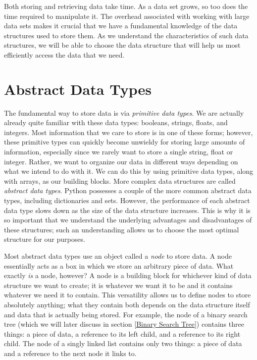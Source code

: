 \label{lab:Python_DataStructures}

Both storing and retrieving data take time. As a data set grows, so too does the time required to manipulate it. 
The overhead associated with working with large data sets makes it crucial that we have a fundamental knowledge of the data structures used to store them.
As we understand the characteristics of such data structures, we will be able to choose the data structure that will help us most efficiently access the data that we need.

\section*{Abstract Data Types}
The fundamental way to store data is via \emph{primitive data types}.
We are actually already quite familiar with these data types: booleans, strings, floats, and integers.
Most information that we care to store is in one of these forms; however, these primitive types can quickly become unwieldy for storing large amounts of information, especially since we rarely want to store a single string, float or integer. Rather, we want to organize our data in different ways depending on what we intend to do with it.
We can do this by using primitive data types, along with arrays, as our building blocks.
More complex data structures are called \emph{abstract data types}.
Python possesses a couple of the more common abstract data types, including dictionaries and sets.
However, the performance of each abstract data type slows down as the size of the data structure increases.
This is why it is so important that we understand the underlying advantages and disadvantages of these structures; such an understanding allows us to choose the most optimal structure for our purposes.

Most abstract data types use an object called a \emph{node} to store data.
A node essentially acts as a box in which we store an arbitrary piece of data.
What exactly \emph{is} a node, however?
A node is a building block for whichever kind of data structure we want to create; it is whatever we want it to be and it contains whatever we need it to contain.
This versatility allows us to define nodes to store absolutely anything; what they contain both depends on the data structure itself and data that is actually being stored.
For example, the node of a binary search tree (which we will later discuss in section \ref{Binary Search Tree}) contains three things: a piece of data, a reference to its left child, and a reference to its right child.
The node of a singly linked list contains only two things: a piece of data and a reference to the next node it links to.

